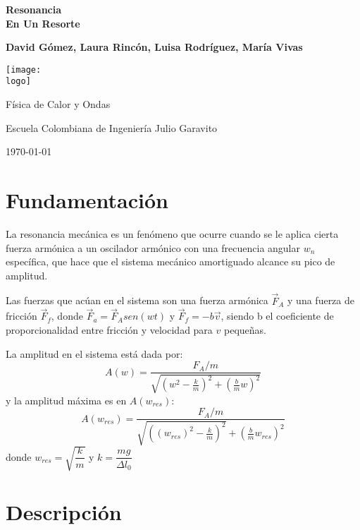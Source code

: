 \documentclass{article}
\newcommand{\logo}{"C:/Users/lalal/OneDrive/Documentos/Universidad/logo-eci.png"}
\newcommand{\titlename}{Resonancia \\[10pt] En Un Resorte}%
\renewcommand{\author}{{David Gómez, Laura Rincón, Luisa Rodríguez, María Vivas}}
\begin{document}
\begin{titlepage}
    \begin{center}
        \vspace{1cm}

        \textbf{\Huge{\titlename}}

        \vspace{1.5cm}

        \textbf{\large{\author}}

        \vspace{3cm}

        \texttt{[image: \\logo]}
        
        \vfill

        Física de Calor y Ondas

        Escuela Colombiana de Ingeniería Julio Garavito 

        \today
    \end{center}
\end{titlepage}

\clearpage
\tableofcontents
\clearpage

\section{Fundamentación}

La resonancia mecánica es un fenómeno que ocurre cuando 
se le aplica cierta fuerza armónica a un oscilador armónico 
con una frecuencia angular $w_n$ específica,
que hace que el sistema mecánico amortiguado alcance su pico
de amplitud. 

Las fuerzas que acúan en el sistema son una fuerza armónica 
$\vec{F}_A$ y una fuerza de fricción $\vec{F}_f$, donde
$\vec{F}_a = \vec{F}_Asen(wt)$ y 
$\vec{F}_f = -b\vec{v}$, siendo b el coeficiente de 
proporcionalidad entre fricción y velocidad para $v$ pequeñas.

La amplitud en el sistema está dada por: 
\[A(w) = \frac{F_A/m}{\sqrt{(w^2 - \frac{k}{m})^2 + (\frac{b}{m}w)^2 }}\]
y la amplitud máxima es en $A(w_{res})$:
\[A(w_{res}) = \frac{F_A/m}{\sqrt{((w_{res})^2 - \frac{k}{m})^2} + (\frac{b}{m}w_{res})^2}\]
donde $w_{res} = \sqrt{\dfrac{k}{m}}$ y $k = \dfrac{mg}{\Delta l_0}$

\clearpage

\section{Descripción}
\end{document}
